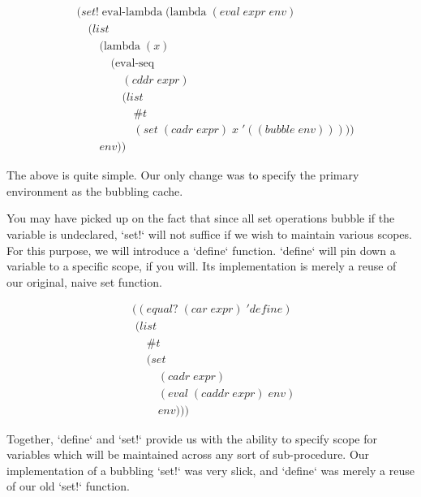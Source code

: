 \begin{align*}
& (set! \; \text{eval-lambda} \; (\text{lambda} \; (eval \; expr \; env)
\\& \quad (list
\\& \qquad (\text{lambda} \; (x) \; 
\\& \qquad \quad (\text{eval-seq} \; 
\\& \qquad \qquad (cddr \; expr) \; 
\\& \qquad \qquad (list
\\& \qquad \qquad \quad \#t
\\& \qquad \qquad \quad (set \; (cadr \; expr) \; x \; '((bubble \; env)))))
\\& \qquad env))
\end{align*}

The above is quite simple. Our only change was to specify the primary
environment as the bubbling cache.

You may have picked up on the fact that since all set operations bubble if
the variable is undeclared, `set!` will not suffice if we wish to maintain
various scopes. For this purpose, we will introduce a `define` function.
`define` will pin down a variable to a specific scope, if you will. Its
implementation is merely a reuse of our original, naive set function.

\begin{align*}
& ((equal? \; (car \; expr) \; 'define)
\\& \; (list \; 
\\& \quad \; \#t \; 
\\& \quad \; (set \; 
\\& \qquad \; (cadr \; expr) \; 
\\& \qquad \; (eval \; (caddr \; expr) \; env) \; 
\\& \qquad \; env)))
\end{align*}

Together, `define` and `set!` provide us with the ability to specify scope
for variables which will be maintained across any sort of sub-procedure. Our
implementation of a bubbling `set!` was very slick, and `define` was merely
a reuse of our old `set!` function.
